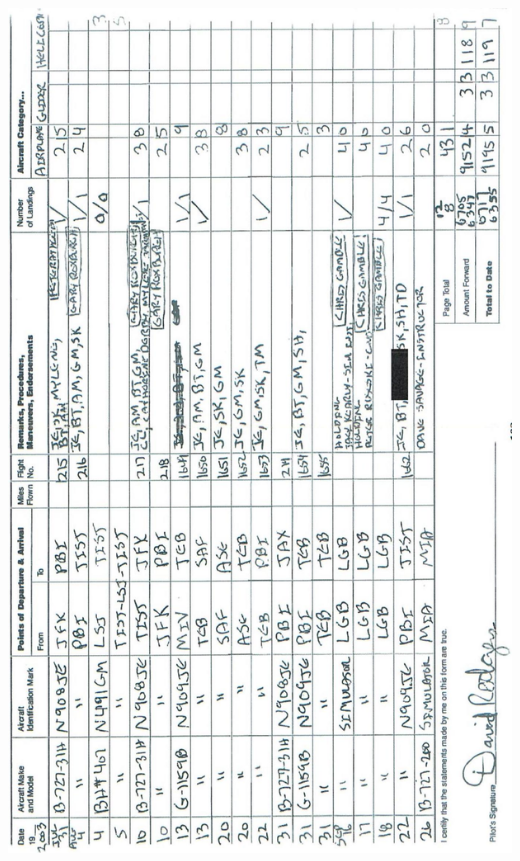 \documentclass[10pt]{article}
\begin{document}
\includegraphics[max width=\textwidth, center]{2025_02_27_dd68c3d38de88f0516d9g-107}\\
\end{document}
